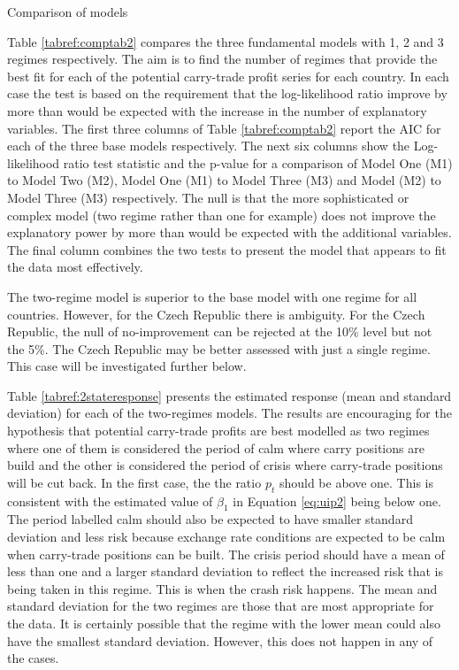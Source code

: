 \documentclass[12pt, a4paper, oneside]{article}\usepackage[]{graphicx}\usepackage[]{color}
\begin{document}
\begin{sidewaystable}[p]
\begin{threeparttable}
\begin{tablenotes}
\end{tablenotes}
\caption{Comparison of models}
\label{tabref:comptab2}
\end{threeparttable}
\end{sidewaystable}

Table \ref{tabref:comptab2} compares the three fundamental models with 1, 2 and 3 regimes respectively.  The aim is to find the number of regimes that provide the best fit for each of the potential carry-trade profit series for each country.  In each case the test is based on the requirement that the log-likelihood ratio improve by more than would be expected with the increase in the number of explanatory variables.  The first three columns of Table \ref{tabref:comptab2} report the AIC for each of the three base models respectively. The next six columns show the Log-likelihood ratio test statistic and the p-value for a comparison of Model One (M1) to Model Two (M2), Model One (M1) to Model Three (M3) and Model (M2) to Model Three (M3) respectively. The null is that the more sophisticated or complex model (two regime rather than one for example) does not improve the explanatory power by more than would be expected with the additional variables. The final column combines the two tests to present the model that appears to fit the data most effectively. 

The two-regime model is superior to the base model with one regime for all countries.  However, for the Czech Republic there is ambiguity.  For the Czech Republic, the null of no-improvement can be rejected at the 10\% level but not the 5\%.  The Czech Republic may be better assessed with just a single regime. This case will be investigated further below. 

Table \ref{tabref:2stateresponse} presents the estimated response (mean and standard deviation) for each of the two-regimes models. The results are encouraging for the hypothesis that potential carry-trade profits are best modelled as two regimes where one of them is considered the period of calm where carry positions are build and the other is considered the period of crisis where carry-trade positions will be cut back.  In the first case, the the ratio $p_t$ should be above one.  This is consistent with the estimated value of $\beta_1$ in Equation \ref{eq:uip2} being below one.  The period labelled calm should also be expected to have smaller standard deviation and less risk because exchange rate conditions are expected to be calm when carry-trade positions can be built.  The crisis period should have a mean of less than one and a larger standard deviation to reflect the increased risk that is being taken in this regime. This is when the crash risk happens.  The mean and standard deviation for the two regimes are those that are most appropriate for the data.  It is certainly possible that the regime with the lower mean could also have the smallest standard deviation.  However, this does not happen in any of the cases. 
\end{document}
